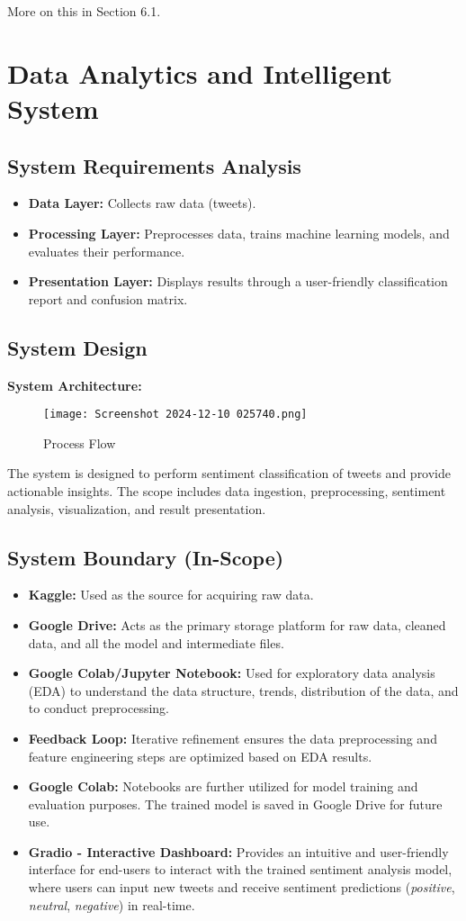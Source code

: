 \documentclass[journal]{IEEEtran}
\begin{document}
More on this in Section 6.1.

\section{\textbf{Data Analytics and Intelligent System}}
\subsection{\textbf{System Requirements Analysis}}
\begin{itemize}
    \item \textbf{Data Layer:} Collects raw data (tweets).
    \item \textbf{Processing Layer:} Preprocesses data, trains machine learning models, and evaluates their performance.
    \item \textbf{Presentation Layer:} Displays results through a user-friendly classification report and confusion matrix.
\end{itemize}
\subsection{\textbf{System Design}}
\textbf{System Architecture:}
\begin{figure}[H]
\centering
\texttt{[image: Screenshot 2024-12-10 025740.png]}
\caption{Process Flow }
\end{figure}
The system is designed to perform sentiment classification of tweets and provide actionable insights. The scope includes data ingestion, preprocessing, sentiment analysis, visualization, and result presentation.

\subsection*{System Boundary (In-Scope)}
\begin{itemize}
    \item \textbf{Kaggle:} Used as the source for acquiring raw data.
    \item \textbf{Google Drive:} Acts as the primary storage platform for raw data, cleaned data, and all the model and intermediate files.
    \item \textbf{Google Colab/Jupyter Notebook:} Used for exploratory data analysis (EDA) to understand the data structure, trends, distribution of the data, and to conduct preprocessing.
    \item \textbf{Feedback Loop:} Iterative refinement ensures the data preprocessing and feature engineering steps are optimized based on EDA results.
    \item \textbf{Google Colab:} Notebooks are further utilized for model training and evaluation purposes. The trained model is saved in Google Drive for future use.
    \item \textbf{Gradio - Interactive Dashboard:} Provides an intuitive and user-friendly interface for end-users to interact with the trained sentiment analysis model, where users can input new tweets and receive sentiment predictions (\textit{positive}, \textit{neutral}, \textit{negative}) in real-time.
\end{itemize}
\end{document}
